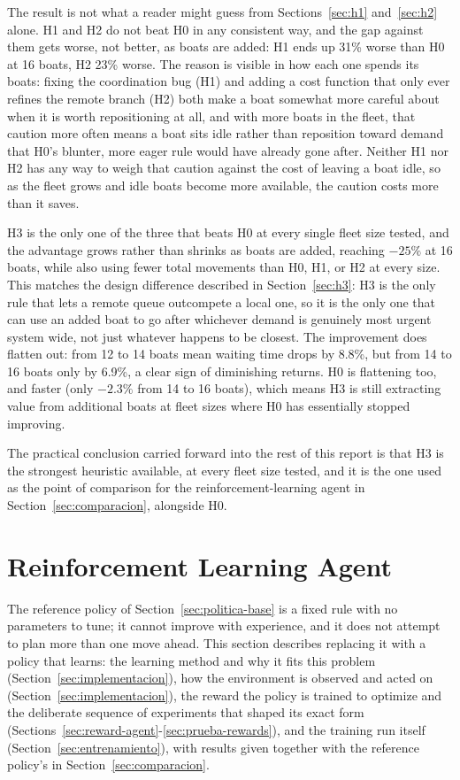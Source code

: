 \documentclass[11pt,a4paper]{article}
\begin{document}
The result is not what a reader might guess from Sections~\ref{sec:h1} and~\ref{sec:h2} alone. H1 and H2 do not beat H0 in any consistent way, and the gap against them gets worse, not better, as boats are added: H1 ends up 31\% worse than H0 at 16 boats, H2 23\% worse. The reason is visible in how each one spends its boats: fixing the coordination bug (H1) and adding a cost function that only ever refines the remote branch (H2) both make a boat somewhat more careful about when it is worth repositioning at all, and with more boats in the fleet, that caution more often means a boat sits idle rather than reposition toward demand that H0's blunter, more eager rule would have already gone after. Neither H1 nor H2 has any way to weigh that caution against the cost of leaving a boat idle, so as the fleet grows and idle boats become more available, the caution costs more than it saves.

H3 is the only one of the three that beats H0 at every single fleet size tested, and the advantage grows rather than shrinks as boats are added, reaching $-25\%$ at 16 boats, while also using fewer total movements than H0, H1, or H2 at every size. This matches the design difference described in Section~\ref{sec:h3}: H3 is the only rule that lets a remote queue outcompete a local one, so it is the only one that can use an added boat to go after whichever demand is genuinely most urgent system wide, not just whatever happens to be closest. The improvement does flatten out: from 12 to 14 boats mean waiting time drops by 8.8\%, but from 14 to 16 boats only by 6.9\%, a clear sign of diminishing returns. H0 is flattening too, and faster (only $-2.3\%$ from 14 to 16 boats), which means H3 is still extracting value from additional boats at fleet sizes where H0 has essentially stopped improving.

The practical conclusion carried forward into the rest of this report is that H3 is the strongest heuristic available, at every fleet size tested, and it is the one used as the point of comparison for the reinforcement-learning agent in Section~\ref{sec:comparacion}, alongside H0.

\section{Reinforcement Learning Agent}
\label{sec:rl}

The reference policy of Section~\ref{sec:politica-base} is a fixed rule with no parameters to tune; it cannot improve with experience, and it does not attempt to plan more than one move ahead. This section describes replacing it with a policy that learns: the learning method and why it fits this problem (Section~\ref{sec:implementacion}), how the environment is observed and acted on (Section~\ref{sec:implementacion}), the reward the policy is trained to optimize and the deliberate sequence of experiments that shaped its exact form (Sections~\ref{sec:reward-agent}-\ref{sec:prueba-rewards}), and the training run itself (Section~\ref{sec:entrenamiento}), with results given together with the reference policy's in Section~\ref{sec:comparacion}.
\end{document}
